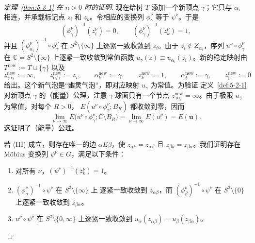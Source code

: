 \begin{proof}[定理~\ref{thm:5-3-1} 在 $n>0$ 时的证明]
现在给树 $T$ 添加一个新顶点 $\gamma$；它只与 $\alpha_i$ 相连，并承载标记点
$z_i$ 和 $z_k$。令相应的变换列 $\phi_\gamma^\nu$ 等于 $\psi^\nu$。于是
\[
  (\phi_\gamma^\nu)^{-1}(z_i^\nu)=0,
  \qquad
  (\phi_\gamma^\nu)^{-1}(z_k^\nu)=1,
\]
并且 $(\phi_{\alpha_i}^\nu)^{-1}\circ\phi_\gamma^\nu$ 在
$S^2\setminus\{\infty\}$ 上逐紧一致收敛到 $z_i$。由于
$z_i\notin Z_{\alpha_i}$，序列 $u^\nu\circ\phi_\gamma^\nu$ 在
$\mathbb C=S^2\setminus\{\infty\}$ 上逐紧一致收敛到常值函数
$u_\gamma(z)\equiv u_{\alpha_i}(z_i)$。新的稳定映射由
$T^{\mathrm{new}}:=T\cup\{\gamma\}$ 以及
\[
  z_{\gamma\alpha_i}^{\mathrm{new}}:=\infty,
  \qquad z_{\alpha_i\gamma}^{\mathrm{new}}:=z_i,
  \qquad \alpha_k^{\mathrm{new}}:=\gamma,
  \qquad z_k^{\mathrm{new}}:=1,
  \qquad \alpha_i^{\mathrm{new}}:=\gamma,
  \qquad z_i^{\mathrm{new}}:=0
\]
给出。这个新气泡是“幽灵气泡”，即对应映射 $u_\gamma$ 为常值。为验证
定义~\ref{def:5-2-1} 对新顶点 $\gamma$ 的（能量）公理，注意
$\gamma$-球面只有一个节点 $z_{\gamma\alpha_i}^{\mathrm{new}}=\infty$。由于极限
$u_\gamma$ 为常值，对每个 $R>0$，
$E(u^\nu\circ\phi_\gamma^\nu;B_R)$ 都收敛到零，因而
\[
  \lim_{\nu\to\infty}
  E\bigl(u^\nu\circ\phi_\gamma^\nu;\mathbb C\setminus B_R\bigr)
  =\lim_{\nu\to\infty}E(u^\nu)=E(\mathbf u).
\]
这证明了（能量）公理。

若 (III) 成立，则存在唯一的边 $\alpha E\beta$，使
$z_{\alpha k}=z_{\alpha\beta}$ 且 $z_{\beta k}=z_{\beta\alpha}$。我们证明存在
Möbius 变换列 $\psi^\nu\in G$，满足以下条件：
\begin{enumerate}[label=(\roman*),leftmargin=3em]
\item 对所有 $\nu$，$(\psi^\nu)^{-1}(z_k^\nu)=1$。

\item $(\phi_\alpha^\nu)^{-1}\circ\psi^\nu$ 在 $S^2\setminus\{\infty\}$ 上
逐紧一致收敛到 $z_{\alpha\beta}$，而
$(\phi_\beta^\nu)^{-1}\circ\psi^\nu$ 在 $S^2\setminus\{0\}$ 上逐紧一致收敛到
$z_{\beta\alpha}$。

\item $u^\nu\circ\psi^\nu$ 在 $S^2\setminus\{0,\infty\}$ 上逐紧一致收敛到
$u_\alpha(z_{\alpha\beta})=u_\beta(z_{\beta\alpha})$。


\end{enumerate}
\end{proof}
